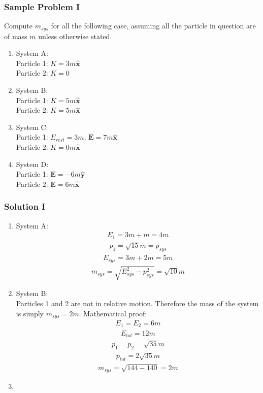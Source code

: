 \documentclass[12pt]{book}
\begin{document}
\subsubsection{Sample Problem I}
Compute $m_{sys}$ for all the following case, assuming all the particle in question are of mass $m$ unless otherwise stated.
\begin{enumerate}
    \item System A: \\
    Particle 1: \(K = 3m \hat{\textbf{x}}\)\\
    Particle 2: \(K = 0\)
    \item System B:\\
    Particle 1: \(K = 5m \hat{\textbf{x}}\)\\
    Particle 2: \(K = 5m \hat{\textbf{x}}\)
    \item System C:\\
    Particle 1: \(E_{rest} = 3m\), \(\textbf{E} = 7m \hat{\textbf{x}}\)\\
    Particle 2: \(K = 0m \hat{\textbf{x}}\)
    \item System D:\\
    Particle 1: \(\textbf{E}=-6m\hat{\textbf{y}}\)\\
    Particle 2: \(\textbf{E}=6m\hat{\textbf{x}}\)
\end{enumerate}
\subsubsection{Solution I}
\begin{enumerate}
    \item System A:
    \begin{align}
    E_1 = 3m + m = 4m\end{align}
    \begin{align}
    p_1 = \sqrt{15}m = p_{sys}
    \end{align}
    \begin{align}
    E_{sys} = 3m + 2m = 5m
    \end{align}
    \begin{align}
    m_{sys} = \sqrt{E_{sys}^2-p_{sys}^2}=\sqrt{10}m
    \end{align}
    \item System B:\\
    Particles 1 and 2 are not in relative motion. Therefore the mass of the system is simply $m_{sys} = 2m$. Mathematical proof:
    \begin{align}
    E_1 = E_2 = 6m
    \end{align}
    \begin{align}
    E_{tot}=12m
    \end{align}
    \begin{align}
    p_1 = p_2 = \sqrt{35}m
    \end{align}
    \begin{align}
    p_{tot}=2\sqrt{35}m
    \end{align}
    \begin{align}
    m_{sys} = \sqrt{144 - 140} = 2m
    \end{align}
    \item 
\end{enumerate}
\end{document}
